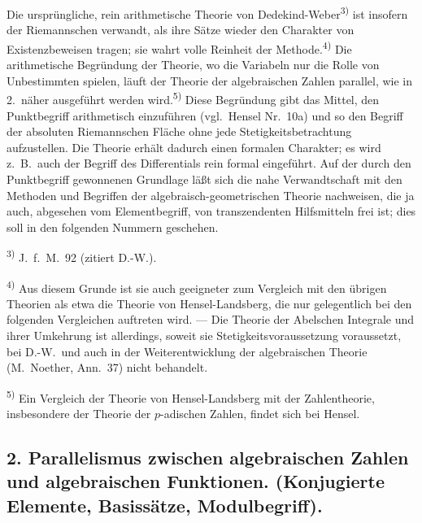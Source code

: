 \documentclass[12pt,a4paper]{article}
\begin{document}
Die urspr\"ungliche, rein arithmetische Theorie von Dedekind-Weber\textsuperscript{3)} ist insofern der Riemannschen verwandt, als ihre S\"atze wieder den Charakter von Existenzbeweisen tragen; sie wahrt volle Reinheit der Methode.\textsuperscript{4)} Die arithmetische Begr\"undung der Theorie, wo die Variabeln nur die Rolle von Unbestimmten spielen, l\"auft der Theorie der algebraischen Zahlen parallel, wie in 2.\ n\"aher ausgef\"uhrt werden wird.\textsuperscript{5)} Diese Begr\"undung gibt das Mittel, den Punktbegriff arithmetisch einzuf\"uhren (vgl.\ Hensel Nr.\ 10a) und so den Begriff der absoluten Riemannschen Fl\"ache ohne jede Stetigkeitsbetrachtung aufzustellen. Die Theorie erh\"alt dadurch einen formalen Charakter; es wird z.\ B.\ auch der Begriff des Differentials rein formal eingef\"uhrt. Auf der durch den Punktbegriff gewonnenen Grundlage l\"a\ss{}t sich die nahe Verwandtschaft mit den Methoden und Begriffen der algebraisch-geometrischen Theorie nachweisen, die ja auch, abgesehen vom Elementbegriff, von transzendenten Hilfsmitteln frei ist; dies soll in den folgenden Nummern geschehen.

\smallskip
\noindent\textsuperscript{3)} J.\ f.\ M.\ 92 (zitiert D.-W.).

\smallskip
\noindent\textsuperscript{4)} Aus diesem Grunde ist sie auch geeigneter zum Vergleich mit den \"ubrigen Theorien als etwa die Theorie von Hensel-Landsberg, die nur gelegentlich bei den folgenden Vergleichen auftreten wird. --- Die Theorie der Abelschen Integrale und ihrer Umkehrung ist allerdings, soweit sie Stetigkeitsvoraussetzung voraussetzt, bei D.-W.\ und auch in der Weiterentwicklung der algebraischen Theorie (M.\ Noether, Ann.\ 37) nicht behandelt.

\smallskip
\noindent\textsuperscript{5)} Ein Vergleich der Theorie von Hensel-Landsberg mit der Zahlentheorie, insbesondere der Theorie der $p$-adischen Zahlen, findet sich bei Hensel.

\subsection*{2. Parallelismus zwischen algebraischen Zahlen und algebraischen Funktionen. (Konjugierte Elemente, Basiss\"atze, Modulbegriff).}
\end{document}
